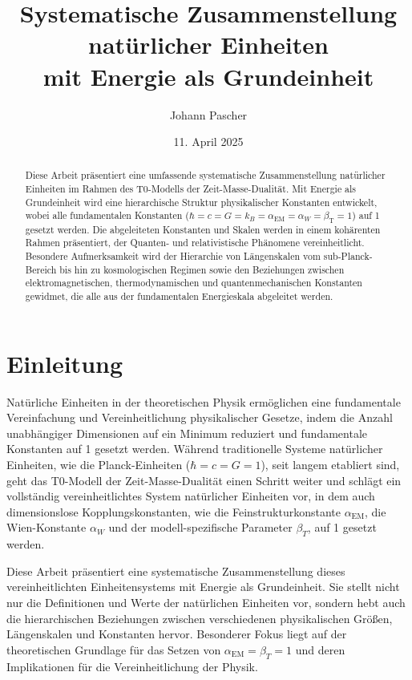 \documentclass[12pt,a4paper]{article}
\title{Systematische Zusammenstellung natürlicher Einheiten \\mit Energie als Grundeinheit}
\author{Johann Pascher}
\date{11. April 2025}
\newcommand{\alphaEM}{\alpha_{\text{EM}}}
\newcommand{\betaT}{\beta_{\text{T}}}
\begin{document}
	
	\maketitle
	
	\begin{abstract}
		Diese Arbeit präsentiert eine umfassende systematische Zusammenstellung natürlicher Einheiten im Rahmen des T0-Modells der Zeit-Masse-Dualität. Mit Energie als Grundeinheit wird eine hierarchische Struktur physikalischer Konstanten entwickelt, wobei alle fundamentalen Konstanten ($\hbar = c = G = k_B = \alphaEM = \alpha_W = \betaT = 1$) auf 1 gesetzt werden. Die abgeleiteten Konstanten und Skalen werden in einem kohärenten Rahmen präsentiert, der Quanten- und relativistische Phänomene vereinheitlicht. Besondere Aufmerksamkeit wird der Hierarchie von Längenskalen vom sub-Planck-Bereich bis hin zu kosmologischen Regimen sowie den Beziehungen zwischen elektromagnetischen, thermodynamischen und quantenmechanischen Konstanten gewidmet, die alle aus der fundamentalen Energieskala abgeleitet werden.
	\end{abstract}
	
	\tableofcontents
	\newpage
	
	\section{Einleitung}
	
	Natürliche Einheiten in der theoretischen Physik ermöglichen eine fundamentale Vereinfachung und Vereinheitlichung physikalischer Gesetze, indem die Anzahl unabhängiger Dimensionen auf ein Minimum reduziert und fundamentale Konstanten auf 1 gesetzt werden. Während traditionelle Systeme natürlicher Einheiten, wie die Planck-Einheiten ($\hbar = c = G = 1$), seit langem etabliert sind, geht das T0-Modell der Zeit-Masse-Dualität einen Schritt weiter und schlägt ein vollständig vereinheitlichtes System natürlicher Einheiten vor, in dem auch dimensionslose Kopplungskonstanten, wie die Feinstrukturkonstante $\alpha_{\text{EM}}$, die Wien-Konstante $\alpha_W$ und der modell-spezifische Parameter $\beta_T$, auf 1 gesetzt werden.
	
	Diese Arbeit präsentiert eine systematische Zusammenstellung dieses vereinheitlichten Einheitensystems mit Energie als Grundeinheit. Sie stellt nicht nur die Definitionen und Werte der natürlichen Einheiten vor, sondern hebt auch die hierarchischen Beziehungen zwischen verschiedenen physikalischen Größen, Längenskalen und Konstanten hervor. Besonderer Fokus liegt auf der theoretischen Grundlage für das Setzen von $\alpha_{\text{EM}} = \beta_T = 1$ und deren Implikationen für die Vereinheitlichung der Physik.
	
\end{document}
